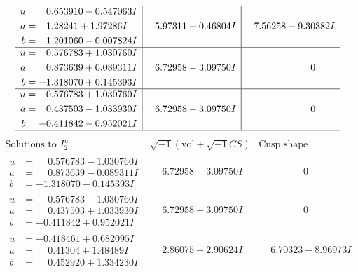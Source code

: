 \documentclass[1p]{elsarticle_modified}
\theoremstyle{definition}
\newcommand{\I}{\sqrt{-1}}
\begin{document}
$$\begin{array}{c|c|c}
\begin{aligned}
u &= \phantom{-}0.653910 - 0.547063 I \\
a &= \phantom{-}1.28241 + 1.97286 I \\
b &= \phantom{-}1.201060 - 0.007824 I\end{aligned}
 & \phantom{-}5.97311 + 0.46804 I & \phantom{-}7.56258 - 9.30382 I \\ \hline\begin{aligned}
u &= \phantom{-}0.576783 + 1.030760 I \\
a &= \phantom{-}0.873639 + 0.089311 I \\
b &= -1.318070 + 0.145393 I\end{aligned}
 & \phantom{-}6.72958 - 3.09750 I & \phantom{-0.000000 } 0 \\ \hline\begin{aligned}
u &= \phantom{-}0.576783 + 1.030760 I \\
a &= \phantom{-}0.437503 - 1.033930 I \\
b &= -0.411842 - 0.952021 I\end{aligned}
 & \phantom{-}6.72958 - 3.09750 I & \phantom{-0.000000 } 0\\
 \hline 
 \end{array}$$\newpage$$\begin{array}{c|c|c}  
\text{Solutions to }I^u_{2}& \I (\text{vol} + \sqrt{-1}CS) & \text{Cusp shape}\\
 \hline 
\begin{aligned}
u &= \phantom{-}0.576783 - 1.030760 I \\
a &= \phantom{-}0.873639 - 0.089311 I \\
b &= -1.318070 - 0.145393 I\end{aligned}
 & \phantom{-}6.72958 + 3.09750 I & \phantom{-0.000000 } 0 \\ \hline\begin{aligned}
u &= \phantom{-}0.576783 - 1.030760 I \\
a &= \phantom{-}0.437503 + 1.033930 I \\
b &= -0.411842 + 0.952021 I\end{aligned}
 & \phantom{-}6.72958 + 3.09750 I & \phantom{-0.000000 } 0 \\ \hline\begin{aligned}
u &= -0.418461 + 0.682095 I \\
a &= \phantom{-}0.41304 + 1.48489 I \\
b &= \phantom{-}0.452920 + 1.334230 I\end{aligned}
 & \phantom{-}2.86075 + 2.90624 I & \phantom{-}6.70323 - 8.96973 I \\ \hline\begin{aligned}

\end{aligned}
\end{array}$$
\end{document}
